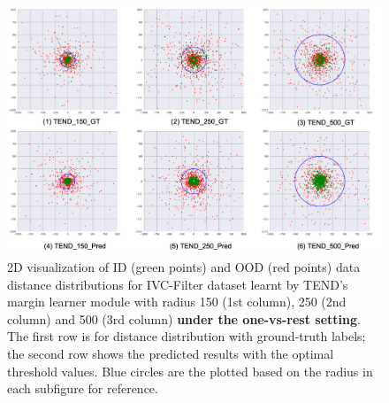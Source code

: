 \documentclass[12pt]{spieman}  %
\begin{document}
\begin{spacing}{2}
\begin{figure}[tp]
\begin{center}
  \includegraphics[width=\linewidth]{fig7.png}
\end{center}
  \caption{2D visualization of ID (green points) and OOD (red points) data distance distributions for IVC-Filter dataset learnt by TEND's margin learner module with radius 150 (1st column), 250 (2nd column) and 500 (3rd column) \textbf{under the one-vs-rest setting}. The first row is for distance distribution with ground-truth labels; the second row shows the predicted results with the optimal threshold values. Blue circles are the plotted based on the radius in each subfigure for reference.} 
\label{fig:ivc}
\end{figure} 


\end{spacing}
\end{document}
